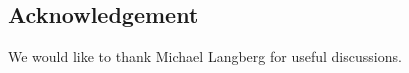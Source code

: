\documentclass[11pt]{article}
\begin{document}


%

%
\subsection*{Acknowledgement} We would like to thank Michael Langberg for useful discussions.
\end{document}
